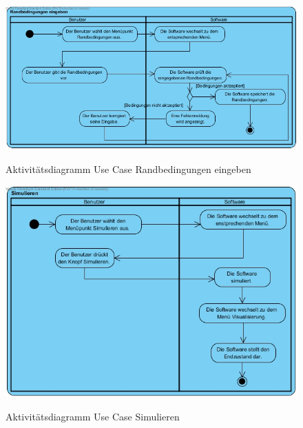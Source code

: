 \begin{figure}[H]
	\centering
	\includegraphics[scale=.5]{Bilder/Randbedingungen_eingeben.jpg}\\
	\caption{Aktivitätsdiagramm Use Case Randbedingungen eingeben}
	\label{Aktivitätsdiagramm Use Case Randbedingungen eingeben}
\end{figure}

\begin{figure}[H]
	\centering
	\includegraphics[scale=.5]{Bilder/Simulieren.jpg}\\
	\caption{Aktivitätsdiagramm Use Case Simulieren}
	\label{Aktivitätsdiagramm Use Case Simulieren}
\end{figure}

